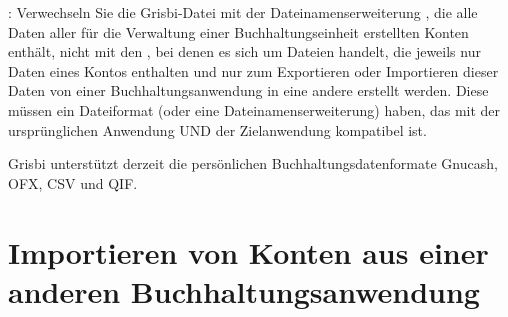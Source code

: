 
\Note{}: Verwechseln Sie die Grisbi-Datei mit der \gls{Dateinamenserweiterung} , die alle Daten aller für die Verwaltung einer Buchhaltungseinheit erstellten Konten enthält, nicht mit den , bei denen es sich um Dateien handelt, die jeweils nur Daten eines Kontos enthalten und nur zum Exportieren oder Importieren dieser Daten von einer Buchhaltungsanwendung in eine andere erstellt werden. Diese  müssen ein \gls{Dateiformat} (oder eine \gls{Dateinamenserweiterung}) haben, das mit der ursprünglichen Anwendung UND der Zielanwendung kompatibel ist.


Grisbi unterstützt derzeit die persönlichen Buchhaltungsdatenformate \gls{Gnucash}, \gls{OFX}, \gls{CSV} und \gls{QIF}.


\section{Importieren von Konten aus einer anderen Buchhaltungsanwendung\label{importexport-import}}

